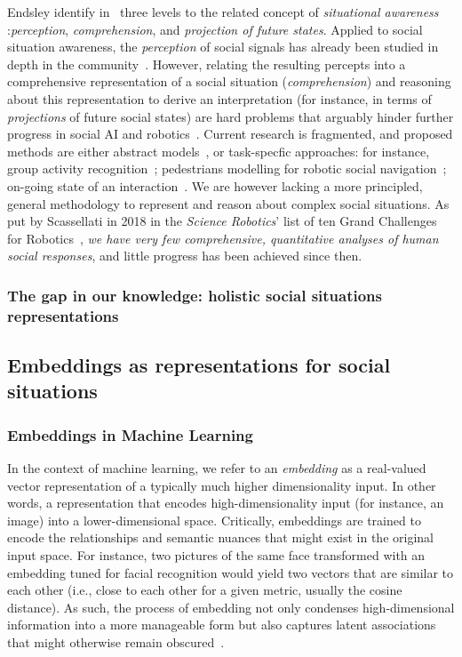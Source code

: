 Endsley identify in~\cite{endsley1995theory} three levels to the related concept
of \textit{situational awareness} :\emph{perception}, \emph{comprehension}, and
\emph{projection of future states}. Applied to social situation awareness,
the \emph{perception} of social signals has already been studied in depth in the
community~\cite{pantic2011social,vinciarelli2009social}.  However, relating the
resulting percepts into a comprehensive representation of a social situation
(\emph{comprehension}) and reasoning about this representation to derive an
interpretation (for instance, in terms of \emph{projections} of future social
states) are hard problems that arguably hinder further progress in social AI and
robotics~\cite{yang2018grand}. Current research is fragmented, and proposed
methods are either abstract models~\cite{gordon2016commonsense}, or task-specfic
approaches: for instance, group activity
recognition~\cite{shu2017cern,wu2019learning}; pedestrians modelling for robotic
social navigation~\cite{alahi2016social}; on-going state of an
interaction~\cite{garcía2020explainable}. We are however lacking a more
principled, general methodology to represent and reason about complex social
situations. As put by Scassellati in 2018 in the \emph{Science Robotics}' list of
ten Grand Challenges for Robotics~\cite{yang2018grand}, \emph{we have very few
comprehensive, quantitative analyses of human social responses}, and little
progress has been achieved since then.


\subsubsection{The gap in our knowledge: holistic social situations
representations}


\subsection{Embeddings as representations for social situations}

\subsubsection{Embeddings in Machine Learning}

In the context of machine learning, we refer to an \emph{embedding} as a
real-valued vector representation of a typically much higher dimensionality
input. In other words, a representation that encodes high-dimensionality input
(for instance, an image) into a lower-dimensional space. Critically, embeddings
are trained to encode the relationships and semantic nuances that might exist in
the original input space. For instance, two pictures of the same face
transformed with an embedding tuned for facial recognition would yield two
vectors that are similar to each other (i.e., close to each other for a given
metric, usually the cosine distance). As such, the process of embedding not only
condenses high-dimensional information into a more manageable form but also
captures latent associations that might otherwise remain
obscured~\cite{bengio2009learning}.

